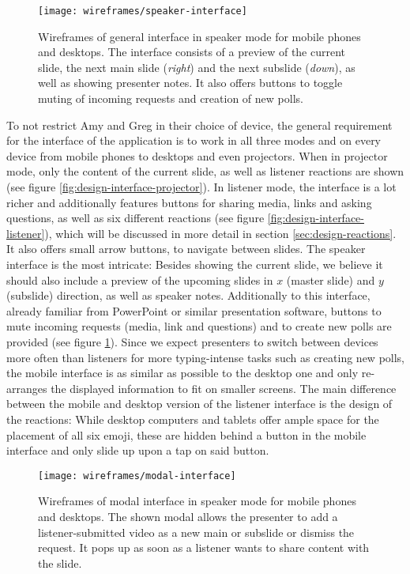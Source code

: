 \begin{figure}
\centering
\texttt{[image: wireframes/speaker-interface]}
\caption{Wireframes of general interface in speaker mode for mobile phones and desktops. The interface consists of a preview of the current slide, the next main slide (\emph{right}) and the next subslide (\emph{down}), as well as showing presenter notes. It also offers buttons to toggle muting of incoming requests and creation of new polls.}
\label{fig:design-interface-presenter}
\end{figure}

To not restrict Amy and Greg in their choice of device, the general requirement for the interface of the application is to work in all three modes and on every device from mobile phones to desktops and even projectors. When in projector mode, only the content of the current slide, as well as listener reactions are shown (see figure \ref{fig:design-interface-projector}). In listener mode, the interface is a lot richer and additionally features buttons for sharing media, links and asking questions, as well as six different reactions (see figure \ref{fig:design-interface-listener}), which will be discussed in more detail in section \ref{sec:design-reactions}. It also offers small arrow buttons, to navigate between slides. The speaker interface is the most intricate: Besides showing the current slide, we believe it should also include a preview of the upcoming slides in $x$ (master slide) and $y$ (subslide) direction, as well as speaker notes. Additionally to this interface, already familiar from PowerPoint or similar presentation software, buttons to mute incoming requests (media, link and questions) and to create new polls are provided (see figure \ref{fig:design-interface-presenter}). Since we expect presenters to switch between devices more often than listeners for more typing-intense tasks such as creating new polls, the mobile interface is as similar as possible to the desktop one and only re-arranges the displayed information to fit on smaller screens. The main difference between the mobile and desktop version of the listener interface is the design of the reactions: While desktop computers and tablets offer ample space for the placement of all six emoji, these are hidden behind a button in the mobile interface and only slide up upon a tap on said button.

\begin{figure}
\centering
\texttt{[image: wireframes/modal-interface]}
\caption{Wireframes of modal interface in speaker mode for mobile phones and desktops. The shown modal allows the presenter to add a listener-submitted video as a new main or subslide or dismiss the request. It pops up as soon as a listener wants to share content with the slide.}
\label{fig:design-interface-modal}
\end{figure}

